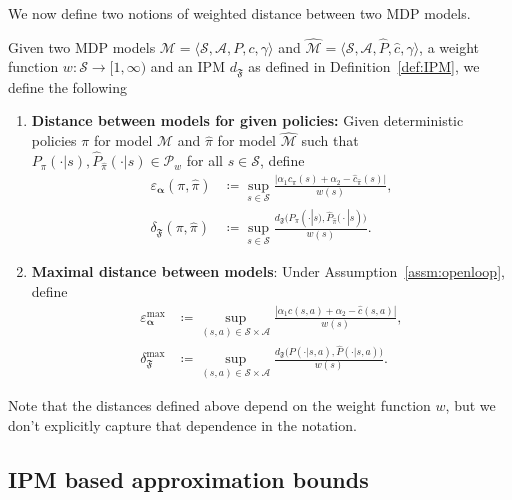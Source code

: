 \documentclass[letterpaper, 10pt]{IEEEtran}
\newcommand*\ALPHABET{\mathcal}
\newcommand\F{\mathfrak{F}}
\begin{document}
We now define two notions of weighted distance between two MDP models.
\begin{definition}\label{def:model_distance}
    Given two MDP models $\ALPHABET M = \langle \ALPHABET S, \ALPHABET A, P, c, \gamma \rangle$ and $\hat{\ALPHABET M} = \langle \ALPHABET S, \ALPHABET A, \hat P, \hat c, \gamma \rangle$, a weight function $w: \ALPHABET S \to [1,\infty)$ and an IPM $d_{\F}$ as defined in Definition~\ref{def:IPM}, we define the following
    
    \begin{enumerate}
        \item \textbf{Distance between models for given policies:} Given deterministic policies $\pi$ for model $\ALPHABET M$ and $\hat\pi$ for model $\hat{\ALPHABET M}$ such that $P_\pi(\cdot | s), \hat P_{\hat \pi}(\cdot | s) \in \ALPHABET P_w$ for all $s \in \ALPHABET S$, define
        \begin{align*}
            \varepsilon_{\boldsymbol{\alpha}}(\pi,\hat\pi) 
            &\coloneqq \sup_{s \in \ALPHABET S}\frac{\bigl|\alpha_1c_{\pi}(s)+\alpha_2-\hat c_{\hat\pi}(s) \bigr|}{w(s)},
            \\
            \delta_{\mathfrak F}(\pi,\hat\pi) &\coloneqq
            \sup_{s \in \ALPHABET S}\frac{d_{\mathfrak F}\bigl(P_{\pi}(\cdot|s\bigr),\hat P_{\hat\pi}\bigl(\cdot|s)\bigr)}{w(s)}.
        \end{align*}
        
        \item \textbf{Maximal distance between models}: Under Assumption~\ref{assm:openloop}, define
        \begin{align*}
            \varepsilon^{\max}_{\boldsymbol{\alpha}} &\coloneqq \sup_{(s,a)\in \ALPHABET S \times \ALPHABET A} \frac{\left|\alpha_1c(s,a)+\alpha_2-\hat c(s,a) \right|}{w(s)},
            \\
            \delta_{\mathfrak F}^{\max} &\coloneqq \sup_{(s,a)\in \ALPHABET S \times \ALPHABET A} 
            \frac{d_{\mathfrak F}\bigl(P(\cdot|s,a),\hat P(\cdot|s,a)\bigr)}{w(s)}.
        \end{align*}
    \end{enumerate}
\end{definition}

Note that the distances defined above depend on the weight function $w$, but we don't explicitly capture that dependence in the notation.

\subsection{IPM based approximation bounds}
\end{document}
